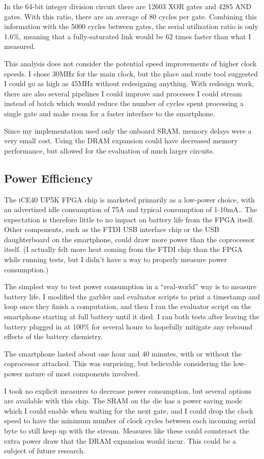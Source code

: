 In the 64-bit integer division circuit\cite{bristol} there are 12603 XOR gates and 4285 AND gates. With this ratio, there are an average of 80 cycles per gate. Combining this information with the 5000 cycles between gates, the serial utilization ratio is only 1.6\%, meaning that a fully-saturated link would be 62 times faster than what I measured.

This analysis does not consider the potential speed improvements of higher clock speeds. I chose 30MHz for the main clock, but the place and route tool suggested I could go as high as 45MHz without redesigning anything. With redesign work, there are also several pipelines I could improve and processes I could stream instead of batch which would reduce the number of cycles spent processing a single gate and make room for a faster interface to the smartphone.

Since my implementation used only the onboard SRAM, memory delays were a very small cost. Using the DRAM expansion could have decreased memory performance, but allowed for the evaluation of much larger circuits. 


\subsection{Power Efficiency}
The iCE40 UP5K FPGA chip is marketed primarily as a low-power choice, with an advertized idle consumption of 75\textmu{}A and typical consumption of 1-10mA.\cite{LatticePage}. The expectation is therefore little to no impact on battery life from the FPGA itself. Other components, such as the FTDI USB interface chip or the USB daughterboard on the smartphone, could draw more power than the coprocessor itself. (I actually felt more heat coming from the FTDI chip than the FPGA while running tests, but I didn't have a way to properly measure power consumption.)

The simplest way to test power consumption in a ``real-world'' way is to measure battery life. I modified the garbler and evaluator scripts to print a timestamp and loop once they finish a computation, and then I ran the evaluator script on the smartphone starting at full battery until it died. I ran both tests after leaving the battery plugged in at 100\% for several hours to hopefully mitigate any rebound effects of the battery chemistry.

The smartphone lasted about one hour and 40 minutes, with or without the coprocessor attached. This was surprising, but believable considering the low-power nature of most components involved.

I took no explicit measures to decrease power consumption, but several options are available with this chip. The SRAM on the die has a power saving mode which I could enable when waiting for the next gate, and I could drop the clock speed to have the minimum number of clock cycles between each incoming serial byte to still keep up with the stream. Measures like these could counteract the extra power draw that the DRAM expansion would incur. This could be a subject of future research.
